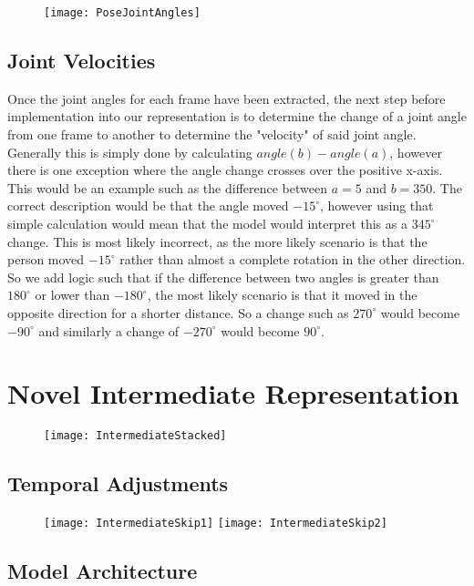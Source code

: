 \begin{figure}[h]
	\texttt{[image: PoseJointAngles]}
	\centering
	\caption{}
	\label{fig:pose-joint-angles}
\end{figure}

\subsection{Joint Velocities}

Once the joint angles for each frame have been extracted, the next step before implementation into our representation is to determine the change of a joint angle from one frame to another to determine the "velocity" of said joint angle. Generally this is simply done by calculating $angle(b) - angle(a)$, however there is one exception where the angle change crosses over the positive x-axis. This would be an example such as the difference between $a = 5$ and $b = 350$. The correct description would be that the angle moved $-15^\circ$, however using that simple calculation would mean that the model would interpret this as a $345^\circ$ change. This is most likely incorrect, as the more likely scenario is that the person moved $-15^\circ$ rather than almost a complete rotation in the other direction. So we add logic such that if the difference between two angles is greater than $180^\circ$ or lower than $-180^\circ$, the most likely scenario is that it moved in the opposite direction for a shorter distance. So a change such as $270^\circ$ would become $-90^\circ$ and similarly a change of $-270^\circ$ would become $90^\circ$.

\section{Novel Intermediate Representation}

\begin{figure}[h]
	\texttt{[image: IntermediateStacked]}
	\centering
	\caption{}
	\label{fig:intermediate-stacked}
\end{figure}

\subsection{Temporal Adjustments}

\begin{figure}
	\texttt{[image: IntermediateSkip1]}
	\texttt{[image: IntermediateSkip2]}
	\centering
	\caption{}
	\label{fig:intermediate-stacked-skip}
\end{figure}

\subsection{Model Architecture}